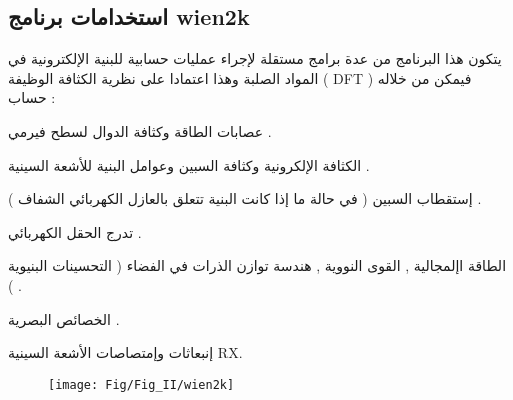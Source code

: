 \subsection{  استخدامات برنامج wien2k }

يتكون هذا البرنامج من عدة  برامج مستقلة لإجراء عمليات حسابية للبنية الإلكترونية في المواد الصلبة وهذا اعتمادا على نظرية الكثافة الوظيفة ( DFT ) فيمكن من خلاله حساب  :
\begin{list}{}{}
	\item 
	عصابات الطاقة وكثافة الدوال لسطح فيرمي .
	\item 
	الكثافة الإلكرونية وكثافة السبين وعوامل البنية للأشعة السينية .
	\item 
	إستقطاب السبين ( في حالة ما إذا كانت البنية تتعلق بالعازل الكهربائي الشفاف ) .
	\item 
	تدرج الحقل الكهربائي .
	\item 
	الطاقة اإلمجالية , القوى النووية , هندسة توازن الذرات في الفضاء ( التحسينات البنيوية ) .
	\item 
	الخصائص البصرية .
	\item 
	إنبعاثات وإمتصاصات الأشعة السينية RX.
\end{list}

\begin{figure}[h!]
	\centering
	\texttt{[image: Fig/Fig\_II/wien2k]}
	\caption{}
	\label{fig:wien2k}
\end{figure}
\FloatBarrier

